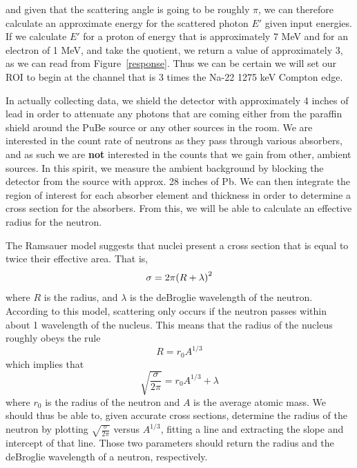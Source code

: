 \documentclass{article}
\DeclarePairedDelimiter{\parens}{\lparen}{\rparen}
\begin{document}
  and given that the scattering angle is going to be roughly $\pi$, we can therefore calculate an approximate energy for the scattered photon $E'$ given input energies.  If we calculate $E'$ for a proton of energy that is approximately 7 MeV and for an electron of 1 MeV, and take the quotient, we return a value of approximately 3, as we can read from Figure~\ref{response}. Thus we can be certain we will set our ROI to begin at the channel that is 3 times the Na-22 1275 keV Compton edge.

  \hspace{.25cm}

  In actually collecting data, we shield the detector with approximately 4 inches of lead in order to attenuate any photons that are coming either from the paraffin shield around the PuBe source or any other sources in the room.  We are interested in the count rate of neutrons as they pass through various absorbers, and as such we are \textbf{not} interested in the counts that we gain from other, ambient sources.  In this spirit, we measure the ambient background by blocking the detector from the source with approx. 28 inches of Pb.  We can then integrate the region of interest for each absorber element and thickness in order to determine a cross section for the absorbers.  From this, we will be able to calculate an effective radius for the neutron.

  \hspace{.25cm}

  The Ramsauer model suggests that nuclei present a cross section that is equal to twice their effective area.  That is,
  \begin{equation*}
    \sigma = 2\pi\parens*{R + \lambda}^2
  \end{equation*}
  where $R$ is the radius, and $\lambda$ is the deBroglie wavelength of the neutron.  According to this model, scattering only occurs if the neutron passes within about 1 wavelength of the nucleus.  This means that the radius of the nucleus roughly obeys the rule
  \begin{equation*}
    R = r_0A^{1/3}
  \end{equation*}
  which implies that
  \begin{equation*}
    \sqrt{\frac{\sigma}{2\pi}} = r_0 A^{1/3} + \lambda
  \end{equation*}
  where $r_0$ is the radius of the neutron and $A$ is the average atomic mass.  We should thus be able to, given accurate cross sections, determine the radius of the neutron by plotting $\sqrt{\frac{\sigma}{2\pi}}$ versus $A^{1/3}$, fitting a line and extracting the slope and intercept of that line.  Those two parameters should return the radius and the deBroglie wavelength of a neutron, respectively.
\end{document}
